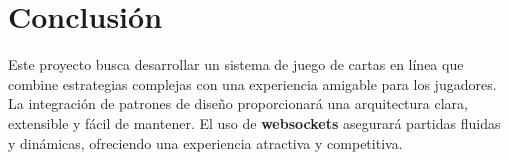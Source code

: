 \documentclass[12pt]{article}
\begin{document}
\section*{Conclusión}
Este proyecto busca desarrollar un sistema de juego de cartas en línea que combine estrategias complejas con una experiencia amigable para los jugadores. La integración de patrones de diseño proporcionará una arquitectura clara, extensible y fácil de mantener. El uso de \textbf{websockets} asegurará partidas fluidas y dinámicas, ofreciendo una experiencia atractiva y competitiva.
\end{document}
